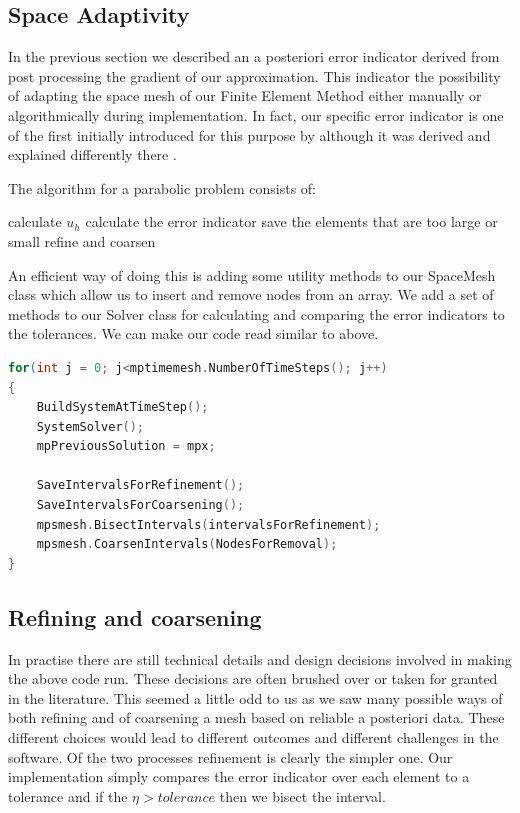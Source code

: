 \documentclass{uonmathreport}
\theoremstyle{definition}
\theoremstyle{problem}
\theoremstyle{theorem}
\begin{document}
\subsection{Space Adaptivity} \label{subsubsec:Space Adaptive}

In the previous section we described an a posteriori error indicator derived from post processing the gradient of our approximation. This indicator the possibility of adapting the space mesh of our Finite Element Method either manually or algorithmically during implementation. In fact, our specific error indicator is one of the first initially introduced for this purpose by \cite{babuska1978posteriori} although it was derived and explained differently there \cite{ainsworth65001posteriori}.

The algorithm for a parabolic problem consists of:


\begin{algorithm}
\begin{algorithmic} 
\STATE calculate $u_h$
\STATE calculate the error indicator
\STATE save the elements that are too large or small
\STATE refine and coarsen
\ENDFOR
\end{algorithmic}
\end{algorithm}

An efficient way of doing this is adding some utility methods to our SpaceMesh class which allow us to insert and remove nodes from an array. We add a set of methods to our Solver class for calculating and comparing the error indicators to the tolerances. We can make our code read similar to above. 


\begin{lstlisting}[language=C++, label=code:adaptive_solver] 
for(int j = 0; j<mptimemesh.NumberOfTimeSteps(); j++)
{
    BuildSystemAtTimeStep();
    SystemSolver();
    mpPreviousSolution = mpx;

    SaveIntervalsForRefinement();
    SaveIntervalsForCoarsening();
    mpsmesh.BisectIntervals(intervalsForRefinement);
    mpsmesh.CoarsenIntervals(NodesForRemoval);
}
\end{lstlisting}



\subsection{Refining and coarsening} \label{subsec:Refine and Coarsen}

In practise there are still technical details and design decisions involved in making the above code run. These decisions are often brushed over or taken for granted in the literature. This seemed a little odd to us as we saw many possible ways of both refining and of coarsening a mesh based on reliable a posteriori data. These different choices would lead to different outcomes and different challenges in the software. 
Of the two processes refinement is clearly the simpler one. Our implementation simply compares the error indicator over each element to a tolerance and if the $\eta > tolerance$ then we bisect the interval.
\end{document}
